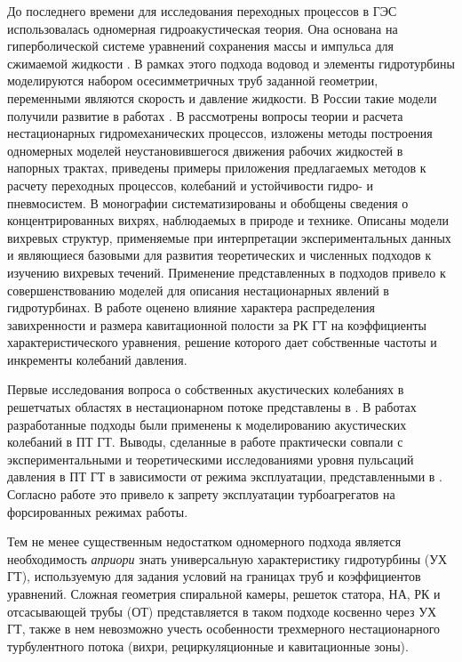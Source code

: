 До последнего времени для исследования переходных процессов в ГЭС использовалась одномерная 
гидроакустическая теория. Она основана на гиперболической системе уравнений сохранения массы и импульса для 
сжимаемой жидкости \cite{Jmud,krivch,Nicol}.
В рамках этого подхода водовод и элементы гидротурбины
моделируются набором осесимметричных труб заданной геометрии, переменными являются скорость и 
давление жидкости. В России такие модели получили развитие в работах 
\cite{Popov,AleksMon,KuiPilZah,Samoil,GorKurBook,GorKurAtlas,KurTurb,Kur93,OkulPil,ArkOkulPil,Kur2013}. 
В \cite{Popov} рассмотрены вопросы теории и расчета нестационарных гидромеханических процессов, 
изложены методы построения одномерных моделей неустановившегося движения рабочих жидкостей в напорных 
трактах, приведены примеры приложения предлагаемых методов к расчету переходных процессов, колебаний 
и устойчивости гидро- и пневмосистем. В монографии \cite{AleksMon} систематизированы и обобщены сведения 
о концентрированных вихрях, наблюдаемых в 
природе и технике. Описаны модели вихревых структур, применяемые при интерпретации экспериментальных данных и
являющиеся базовыми для развития теоретических и численных подходов к изучению вихревых течений. Применение 
представленных в \cite{AleksMon} подходов привело к совершенствованию моделей для описания нестационарных 
явлений в гидротурбинах. В работе \cite{KuiPilZah} оценено влияние характера распределения завихренности и 
размера кавитационной полости за РК ГТ на коэффициенты характеристического уравнения, решение которого
дает собственные частоты и инкременты колебаний давления. 

Первые исследования вопроса о собственных акустических колебаниях в решетчатых областях 
в нестационарном потоке представлены в \cite{Samoil,GorKurBook,GorKurAtlas}. В работах \cite{KurTurb,Kur93}
разработанные подходы были применены к моделированию акустических колебаний в ПТ ГТ. Выводы, сделанные 
в работе \cite{Kur93} практически совпали с экспериментальными и теоретическими исследованиями уровня 
пульсаций давления в ПТ ГТ в зависимости от режима эксплуатации, представленными в \cite{OkulPil,ArkOkulPil}.
Согласно работе \cite{Kur2013} это привело к запрету эксплуатации турбоагрегатов на форсированных 
режимах работы.

Тем не менее существенным недостатком одномерного подхода является 
необходимость {\it априори} знать универсальную характеристику гидротурбины (УХ ГТ), используемую 
для задания условий на границах труб и коэффициентов уравнений.
Сложная геометрия спиральной камеры, решеток статора, НА, РК и отсасывающей трубы (ОТ) представляется 
в таком подходе косвенно через УХ ГТ, также в нем невозможно учесть особенности трехмерного нестационарного
турбулентного потока (вихри, рециркуляционные и кавитационные зоны).


